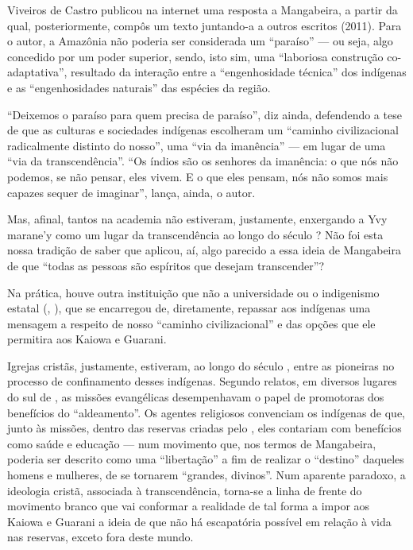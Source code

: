 Viveiros de Castro publicou na internet uma resposta a Mangabeira, a
partir da qual, posteriormente, compôs um texto juntando-a a outros
escritos (2011). Para o autor, a Amazônia não poderia ser considerada
um ``paraíso'' --- ou seja, algo concedido por um poder superior, sendo,
isto sim, uma ``laboriosa construção co-adaptativa'', resultado da
interação entre a ``engenhosidade técnica'' dos indígenas e as
``engenhosidades naturais''  das espécies da região. 

``Deixemos o paraíso para quem precisa de paraíso'', diz ainda, defendendo
a tese de que as culturas e sociedades indígenas escolheram um ``caminho
civilizacional radicalmente distinto do nosso'', uma ``via da imanência''
--- em lugar de uma ``via da transcendência''. ``Os índios são os senhores
da imanência: o que nós não podemos, se não pensar, eles vivem. E o que
eles pensam, nós não somos mais capazes sequer de imaginar'', lança,
ainda, o autor.

Mas, afinal, tantos na academia não estiveram, justamente, enxergando a
Yvy marane’y como um lugar da transcendência ao longo do século ? Não
foi esta nossa tradição de saber que aplicou, aí, algo parecido a essa
ideia de Mangabeira de que ``todas as pessoas são espíritos que desejam
transcender''?

Na prática, houve outra instituição que não a universidade ou o
indigenismo estatal (, ), que se encarregou de, diretamente,
repassar aos indígenas uma mensagem a respeito de nosso ``caminho
civilizacional'' e das opções que ele permitira aos Kaiowa e Guarani. 

Igrejas cristãs, justamente, estiveram, ao longo do século , entre as
pioneiras no processo de confinamento desses indígenas. Segundo
relatos, em diversos lugares do sul de , as missões evangélicas
desempenhavam o papel de promotoras dos benefícios do ``aldeamento''. Os
agentes religiosos convenciam os indígenas de que, junto às missões,
dentro das reservas criadas pelo , eles contariam com benefícios
como saúde e educação --- num movimento que, nos termos de Mangabeira,
poderia ser descrito como uma ``libertação'' a fim de realizar o
``destino'' daqueles homens e mulheres, de se tornarem ``grandes,
divinos''. Num aparente paradoxo, a ideologia cristã, associada à
transcendência, torna-se a linha de frente do movimento branco que vai
conformar a realidade de tal forma a impor aos Kaiowa e Guarani a ideia
de que não há escapatória possível em relação à vida nas reservas,
exceto fora deste mundo. 

